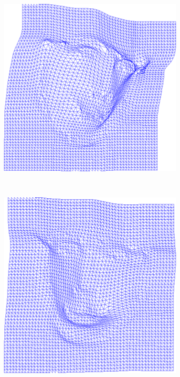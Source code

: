 \begin{figure}[h]
\begin{subfigure}[b]{0.15\textwidth}
    \end{subfigure}
    \hfill
    \begin{subfigure}[b]{0.15\textwidth}
            \includegraphics[width=\textwidth]{resources/Fig_Flows/2}
    \end{subfigure}
    \\
    \begin{subfigure}[b]{0.15\textwidth}
            \includegraphics[width=\textwidth]{resources/Fig_Flows/3}

\end{subfigure}
\end{figure}
